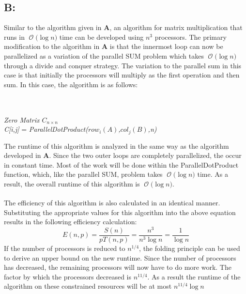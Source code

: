 \documentclass[12pt]{article}
\newcommand{\BigO}[1]{\ensuremath{\operatorname{\mathcal{O}}\bigl(#1\bigr)}}
\begin{document}
\subsection*{B:}
Similar to the algorithm given in \textbf{A}, an algorithm for 
matrix multiplication that runs in \BigO{\log n} time can be
developed using $n^3$ processors.  The primary modification
to the algorithm in \textbf{A} is that the innermost loop
can now be parallelized as a variation of the parallel SUM
problem which takes \BigO{\log n} through a divide and conquer
strategy.  The variation to the parallel sum in this case
is that initially the processors will multiply as the first
operation and then sum.
In this case, the algorithm is as follows:
\begin{algorithm}[H]
\\
\\
\textit{Zero Matrix $C_{n\times n}$}\\
{
{
   \textit{C[i,j]} = \textit{ParallelDotProduct($row_i(A)$,$col_j(B)$,n)}\\ 
}
}
\end{algorithm}
The runtime of this algorithm is analyzed in the same way as
the algorithm developed in \textbf{A}.  Since the two outer 
loops are completely parallelized, the occur in constant time.
Most of the work will be done within the ParallelDotProduct
function, which, like the parallel SUM, problem takes \BigO{\log n}
time.  As a result, the overall runtime of this algorithm is
\BigO{\log n}.\\\\
The efficiency of this algorithm is also calculated in an 
identical manner.  Substituting the appropriate values for
this algorithm into the above equation results in the
following efficiency calculation:
\[
    E(n,p) = \frac{S(n)}{pT(n,p)} = \frac{n^3}{n^3 \log n} = \frac{1}{\log n}
\]
If the number of processors is reduced to $n^{1/4}$, the folding principle
can be used to derive an upper bound on the new runtime.  Since the number
of processors has decreased, the remaining processors will now have to do 
more work.  The factor by which the processors decreased is $n^{11/4}$.
As a result the runtime of the algorithm on these constrained resources
will be at most $n^{11/4} \log n$
\end{document}
